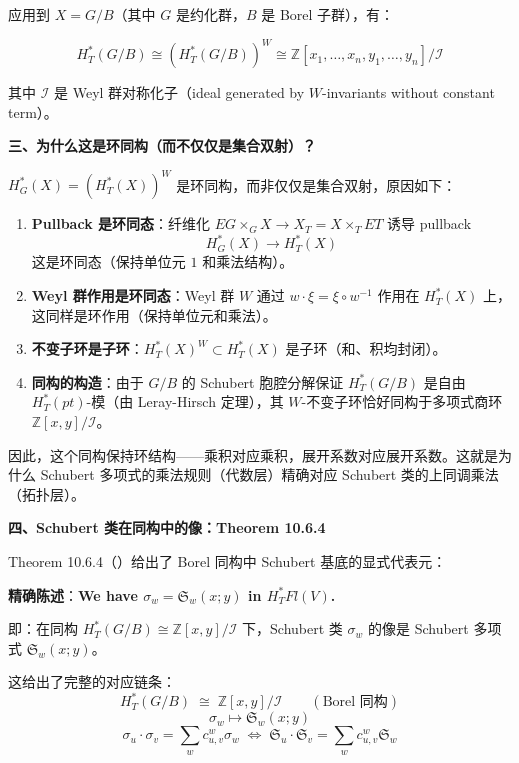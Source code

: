 应用到 $X = G/B$（其中 $G$ 是约化群，$B$ 是 Borel 子群），有：

$$H_T^*(G/B) \cong (H_T^*(G/B))^W \cong \mathbb{Z}[x_1,\ldots,x_n,y_1,\ldots,y_n] / \mathcal{I}$$

其中 $\mathcal{I}$ 是 Weyl 群对称化子（ideal generated by $W$-invariants without constant term）。

\textbf{三、为什么这是环同构（而不仅仅是集合双射）？}

$H_G^*(X) = (H_T^*(X))^W$ 是环同构，而非仅仅是集合双射，原因如下：

\begin{enumerate}
\item \textbf{Pullback 是环同态}：纤维化 $EG \times_G X \to X_T = X \times_T ET$ 诱导 pullback
$$H_G^*(X) \to H_T^*(X)$$
这是环同态（保持单位元 $1$ 和乘法结构）。

\item \textbf{Weyl 群作用是环同态}：Weyl 群 $W$ 通过 $w \cdot \xi = \xi \circ w^{-1}$ 作用在 $H_T^*(X)$ 上，这同样是环作用（保持单位元和乘法）。

\item \textbf{不变子环是子环}：$H_T^*(X)^W \subset H_T^*(X)$ 是子环（和、积均封闭）。

\item \textbf{同构的构造}：由于 $G/B$ 的 Schubert 胞腔分解保证 $H_T^*(G/B)$ 是自由 $H_T^*(pt)$-模（由 Leray-Hirsch 定理），其 $W$-不变子环恰好同构于多项式商环 $\mathbb{Z}[x,y]/\mathcal{I}$。
\end{enumerate}

因此，这个同构保持环结构——乘积对应乘积，展开系数对应展开系数。这就是为什么 Schubert 多项式的乘法规则（代数层）精确对应 Schubert 类的上同调乘法（拓扑层）。

\textbf{四、Schubert 类在同构中的像：Theorem 10.6.4}

Theorem 10.6.4（\cite[ Theorem 10.6.4]{anderson2023}）给出了 Borel 同构中 Schubert 基底的显式代表元：

\textbf{精确陈述}：\textbf{We have $\sigma_w = \mathfrak{S}_w(x;y)$ in $H_T^* Fl(V)$.}

即：在同构 $H_T^*(G/B) \cong \mathbb{Z}[x,y]/\mathcal{I}$ 下，Schubert 类 $\sigma_w$ 的像是 Schubert 多项式 $\mathfrak{S}_w(x;y)$。

这给出了完整的对应链条：
$$H_T^*(G/B) \;\cong\; \mathbb{Z}[x,y]/\mathcal{I} \qquad (\text{Borel 同构})$$
$$\sigma_w \mapsto \mathfrak{S}_w(x;y)$$
$$\sigma_u \cdot \sigma_v = \sum_w c_{u,v}^w \sigma_w \;\Longleftrightarrow\; \mathfrak{S}_u \cdot \mathfrak{S}_v = \sum_w c_{u,v}^w \mathfrak{S}_w$$

